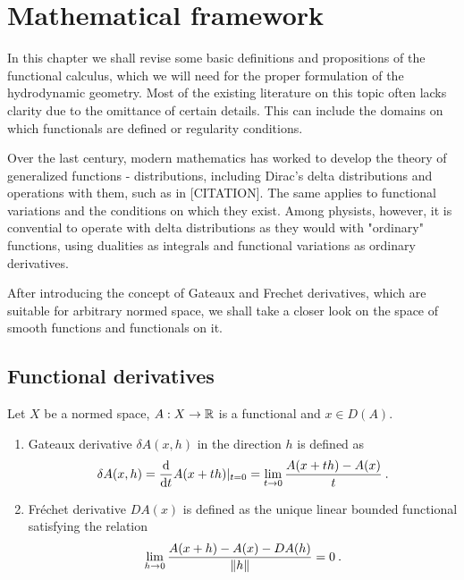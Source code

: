 \chapter{Mathematical framework}

In this chapter we shall revise some basic definitions and propositions of the functional calculus, which we will need for the proper formulation of the hydrodynamic geometry. Most of the existing literature on this topic often lacks clarity due to the omittance of certain details. This can include the domains on which functionals are defined or regularity conditions.

Over the last century, modern mathematics has worked to develop the theory of generalized functions - distributions, including Dirac's delta distributions and operations with them, such as in [CITATION]. The same applies to functional variations and the conditions on which they exist. 
Among physists, however, it is convential to operate with delta distributions as they would with "ordinary" functions, using dualities as integrals and functional variations as ordinary derivatives.


After introducing the concept of Gateaux and Frechet derivatives, which are suitable for arbitrary normed space, we shall take a closer look on the space of smooth functions and functionals on it.

\section{Functional derivatives}


\begin{definition}
    Let $X$ be a normed space, $A: X \to \mathbb{R}$ is a functional and $x \in D(A)$.
    \begin{enumerate}
        \item Gateaux derivative $\delta A(x,h)$ in the direction $h$ is defined as
        \begin{align}
            \delta A (x,h) = \frac{\mathrm{d}}{\mathrm{d}t} A(x+th) |_{t=0} = \lim_{t \rightarrow 0} \frac{A(x+th)-A(x)}{t} \:.
        \end{align}

        \item Fréchet derivative $DA(x)$ is defined as the unique linear bounded functional satisfying the relation
        \begin{align}
            \lim_{h \rightarrow 0} \frac{A(x+h)-A(x)- DA(h)}{\left \Vert h \right \Vert} = 0 \:.
        \end{align}
    \end{enumerate}
\end{definition}

